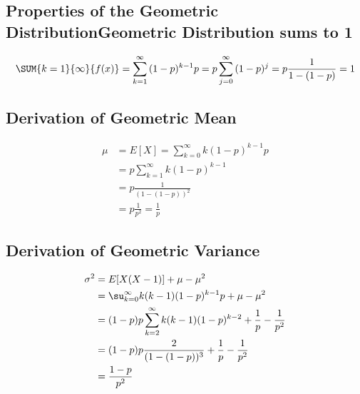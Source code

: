 \documentclass[10pt,]{book}
\theoremstyle{plain}
\theoremstyle{definition}
\theoremstyle{definition}
\numberwithin{equation}{section}
\begin{document}
\subsection[Properties of the Geometric DistributionGeometric Distribution sums to 1]{Properties of the Geometric DistributionGeometric Distribution sums to 1}\label{subsection-15}
\begin{gather*}
\SUM {k=1} {\infty} {f(x)} = \sum_{k=1}^{\infty} {(1-p)^{k-1} p} = p \sum_{j=0}^{\infty} {(1-p)^j} = p \frac{1}{1-(1-p)} = 1
\end{gather*}\typeout{************************************************}
\typeout{************************************************}
\subsection[Derivation of Geometric Mean]{Derivation of Geometric Mean}\label{subsection-16}
\begin{align*}
\mu & = E[X] = \sum_{k=0}^{\infty} {k(1-p)^{k-1}p}\\
 & = p \sum_{k=1}^{\infty} {k(1-p)^{k-1}}\\
 & = p \frac{1}{(1-(1-p))^2}\\
 & = p \frac{1}{p^2} = \frac{1}{p}
\end{align*}\typeout{************************************************}
\typeout{************************************************}
\subsection[Derivation of Geometric Variance]{Derivation of Geometric Variance}\label{subsection-17}
\begin{align*}
\sigma^2 & = E[X(X-1)] + \mu - \mu^2 \\
 & = \su _{k=0}^{\infty} {k(k-1)(1-p)^{k-1}p} + \mu - \mu^2 \\
 & = (1-p)p \sum_{k=2}^{\infty} {k(k-1)(1-p)^{k-2}} + \frac{1}{p} - \frac{1}{p^2}\\
 & = (1-p)p \frac{2}{(1-(1-p))^3} + \frac{1}{p} - \frac{1}{p^2}\\
 & = \frac{1-p}{p^2}
\end{align*}\typeout{************************************************}
\typeout{************************************************}
\end{document}
